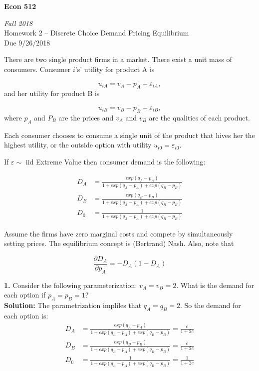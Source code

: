 \documentclass[10pt]{article}
\begin{document}
\begin{center}
\textbf{Econ 512}

\emph{Fall 2018}\\[1em]

Homework 2 -- Discrete Choice Demand Pricing Equilibrium \\
Due 9/26/2018
\\[3em]
\end{center}

There are two single product firms in a market. There exist a unit mass of consumers. Consumer $i$'s'  utility for product A is

$$u_{iA} = v_A - p_A + \varepsilon_{iA},$$
and her utility for product B is

$$u_{iB} = v_B - p_B + \varepsilon_{iB},$$
where $p_A$ and $P_B$ are the prices and $v_A$ and $v_B$ are the qualities of each product.  

Each consumer chooses to consume a single unit of the product that hives her the highest utility, or the outside option with utility $u_{i0} = \varepsilon_{i0}$.

If $\varepsilon\sim$ iid Extreme Value then consumer demand is the following:

\begin{align*}
D_A &= \frac{exp(q_A - p_A)}{1 + exp(q_A - p_A) + exp(q_B - p_B)} \\
D_B &= \frac{exp(q_B - p_B)}{1 + exp(q_A - p_A) + exp(q_B - p_B)} \\
D_0 &= \frac{1}{1 + exp(q_A - p_A) + exp(q_B - p_B)} 
\end{align*} 

Assume the firms have zero marginal costs and compete by simultaneously setting prices. The equilibrium concept is (Bertrand) Nash. Also, note that 

$$\frac{\partial D_A}{\partial p_A} = -D_A(1-D_A)$$

\vspace{2em}

\noindent
\textbf{1.} Consider the following parameterization: $v_A=v_B=2$. What is the demand for each option if $p_A=p_B=1$?\\[2em]

\noindent
\textbf{Solution:} The parametrization impliles that $q_A=q_B=2$. So the demand for each option is:\\
\begin{align*}
D_A &= \frac{exp(q_A - p_A)}{1 + exp(q_A - p_A) + exp(q_B - p_B)} =\frac{e}{1+2e}\\
D_B &= \frac{exp(q_B - p_B)}{1 + exp(q_A - p_A) + exp(q_B - p_B)}= \frac{e}{1+2e}\\
D_0 &= \frac{1}{1 + exp(q_A - p_A) + exp(q_B - p_B)} =\frac{1}{1+2e}
\end{align*} \\[2em]
\end{document}
